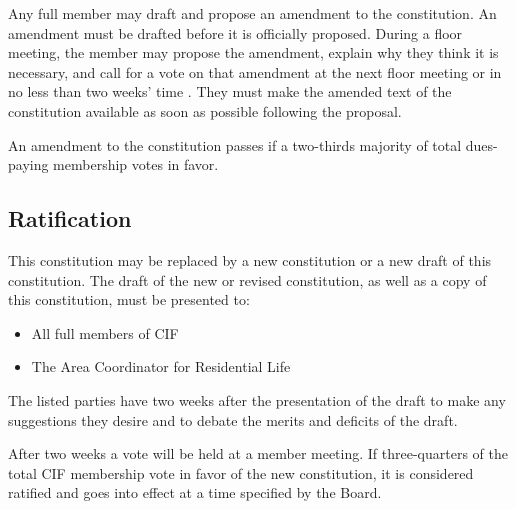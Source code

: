 \documentclass[12pt]{amsart}
\begin{document}
Any full member may draft and propose an amendment to the constitution. An amendment must be drafted before it is officially proposed. During a floor meeting, the member may propose the amendment, explain why they think it is necessary, and call for a vote on that amendment at the next floor meeting or in no less than two weeks' time	. They must make the amended text of the constitution available as soon as possible following the proposal.

An amendment to the constitution passes if a two-thirds majority of total dues-paying membership votes in favor.
	\subsection {Ratification}
This constitution may be replaced by a new constitution or a new draft of this constitution. The draft of the new or revised constitution, as well as a copy of this constitution, must be presented to:
\begin{itemize}
	\item All full members of CIF
	\item The Area Coordinator for Residential Life
\end{itemize}
The listed parties have two weeks after the presentation of the draft to make any suggestions they desire and to debate the merits and deficits of the draft.

After two weeks a vote will be held at a member meeting. If three-quarters of the total CIF membership vote in favor of the new constitution, it is considered ratified and goes into effect at a time specified by the Board.
\end{document}
